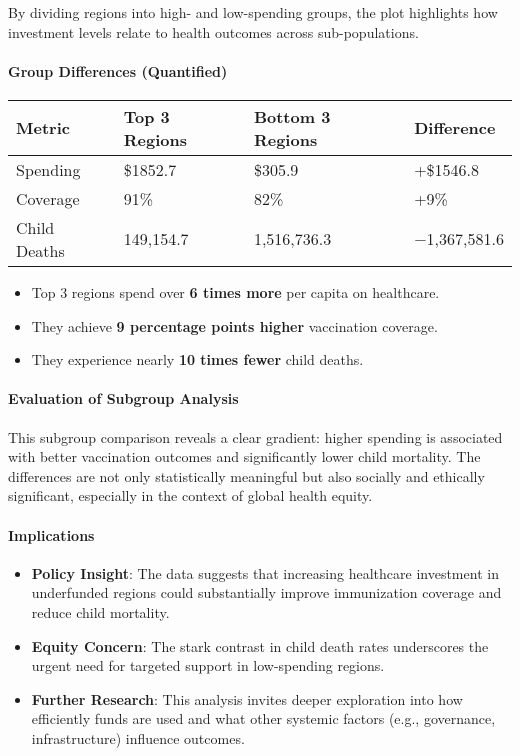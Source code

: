 \documentclass[
]{article}
\providecommand{\tightlist}{%
  \setlength{\itemsep}{0pt}\setlength{\parskip}{0pt}}
\begin{document}
By dividing regions into high- and low-spending groups, the plot
highlights how investment levels relate to health outcomes across
sub-populations.

\paragraph{Group Differences
(Quantified)}\label{group-differences-quantified}

\begin{longtable}[]{@{}llll@{}}
\toprule\noalign{}
Metric & Top 3 Regions & Bottom 3 Regions & Difference \\
\midrule\noalign{}
\endhead
\bottomrule\noalign{}
\endlastfoot
Spending & \$1852.7 & \$305.9 & +\$1546.8 \\
Coverage & 91\% & 82\% & +9\% \\
Child Deaths & 149,154.7 & 1,516,736.3 & −1,367,581.6 \\
\end{longtable}

\begin{itemize}
\tightlist
\item
  Top 3 regions spend over \textbf{6 times more} per capita on
  healthcare.
\item
  They achieve \textbf{9 percentage points higher} vaccination coverage.
\item
  They experience nearly \textbf{10 times fewer} child deaths.
\end{itemize}

\paragraph{Evaluation of Subgroup
Analysis}\label{evaluation-of-subgroup-analysis}

This subgroup comparison reveals a clear gradient: higher spending is
associated with better vaccination outcomes and significantly lower
child mortality. The differences are not only statistically meaningful
but also socially and ethically significant, especially in the context
of global health equity.

\paragraph{Implications}\label{implications-1}

\begin{itemize}
\tightlist
\item
  \textbf{Policy Insight}: The data suggests that increasing healthcare
  investment in underfunded regions could substantially improve
  immunization coverage and reduce child mortality.
\item
  \textbf{Equity Concern}: The stark contrast in child death rates
  underscores the urgent need for targeted support in low-spending
  regions.
\item
  \textbf{Further Research}: This analysis invites deeper exploration
  into how efficiently funds are used and what other systemic factors
  (e.g., governance, infrastructure) influence outcomes.
\end{itemize}
\end{document}
